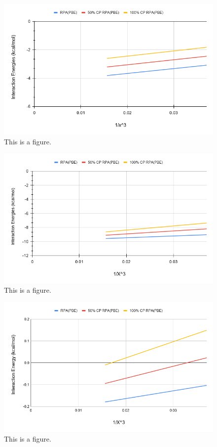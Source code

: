 \documentclass[11pt]{article}
\begin{document}
\begin{figure}
  \includegraphics[scale=0.5]{tpss_30.png}
  \caption{This is a figure.}
  \label{fig:<name>}
\end{figure}

\begin{figure}
  \includegraphics[scale=0.5]{tpss_38.png}
  \caption{This is a figure.}
  \label{fig:<name>}
\end{figure}

\begin{figure}
  \includegraphics[scale=0.5]{tpssh_1.png}
  \caption{This is a figure.}
  \label{fig:<name>}
\end{figure}
\end{document}
